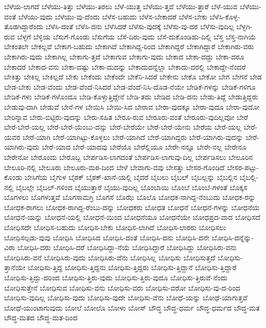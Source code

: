 {ಬೆಳೆಯ-ಲಾಗದೆ
ಬೆಳೆಯು-ತಿತ್ತು
ಬೆಳೆಯು-ತಿರಲು
ಬೆಳೆ-ಯುತ್ತ
ಬೆಳೆಯು-ತ್ತವೆ
ಬೆಳೆಯು-ತ್ತಾರೆ
ಬೆಳೆ-ಯುವ
ಬೆಳೆಯು-ವಂತೆ
ಬೆಳೆಯು-ವುದು
ಬೆಳೆಯು-ವು-ದೆಂದು
ಬೆಳೆಸ-ಬಹುದು
ಬೆಳೆಸ-ಬೇಕಾದರೆ
ಬೆಳೆಸ-ಬೇಕು
ಬೆಳೆಸಿ-ಕೊಳ್ಳ-ತೊಡಗಿದ್ದಾರೆಂದು
ಬೆಳೆಸಿ-ದಂತೆ
ಬೆಳೆಸಿ-ದನು
ಬೆಳೆಸಿದರೆ
ಬೆಳೆಸು-ವುದಕ್ಕೆ
ಬೆಳೆಸು-ವು-ದರ
ಬೆಳೆಸು-ವುದಿಲ್ಲ
ಬೆಳ್ಳಗಿ-ರುವ
ಬೆಳ್ಳಗೆ
ಬೆಳ್ಳಿಯ
ಬೆಸುಗೆ-ಗೊಂಡು
ಬೆಸುಗೆಯ
ಬೆಸೆ-ದಿರು-ವುದು
ಬೆಸೆ-ದುಕೊಂಡಿಹು-ದಿಲ್ಲಿ
ಬೆಸ್ತ
ಬೆಸ್ತ-ನಾಗಿಯೆ
ಬೇಕಂತಲೇ
ಬೇಕಲ್ಲವೆ
ಬೇಕಾಗ-ಬಹುದು
ಬೇಕಾಗಿದೆ
ಬೇಕಾಗಿದ್ದ-ರಿಂದ
ಬೇಕಾಗಿದ್ದರೆ
ಬೇಕಾಗಿದ್ದಾರೆ
ಬೇಕಾಗಿರು-ವರು
ಬೇಕಾಗಿರು-ವುದು
ಬೇಕಾಗಿಲ್ಲ
ಬೇಕಾಗು-ತ್ತದೆ
ಬೇಕಾಗುವ
ಬೇಕಾಗು-ವುದು
ಬೇಕಾದ
ಬೇಕಾ-ದದ್ದು
ಬೇಕಾ-ದರೂ
ಬೇಕಾದರೆ
ಬೇಕಾದ-ವನು
ಬೇಕಾ-ದಷ್ಟು
ಬೇಕಾ-ದುದನ್ನು
ಬೇಕಾದುದನ್ನೆಲ್ಲಾ
ಬೇಕಾದು-ದರಲ್ಲಿ
ಬೇಕಾದ್ದೇ-ನೆಂದರೆ
ಬೇಕಿತ್ತು
ಬೇಕಿಲ್ಲ
ಬೇಕಿಲ್ಲದೆ
ಬೇಕು
ಬೇಕೆಂದು
ಬೇಕೆಂದೇ
ಬೇಕೆನಿ-ಸಿದರೆ
ಬೇಕೇನು
ಬೇಕೊ
ಬೇಕೋ
ಬೇಗ
ಬೇಗನೆ
ಬೇಡ
ಬೇಡ-ಬೇಕು
ಬೇಡ-ವೆಂದು
ಬೇಡ-ವೆಂದೆ-ನಿಸಿದರೆ
ಬೇಡ-ವೆಂದೆ-ನಿಸಿ-ದೊಡ-ನೆಯೇ
ಬೇಡಿಕೆ-ಗಳನ್ನು
ಬೇಡಿಕೆ-ಗಳಿಗೂ
ಬೇಡಿಕೆ-ಗಳು
ಬೇಡಿಕೆ-ಗಳೊಂದೂ
ಬೇಡಿ-ಕೊಳ್ಳುತ್ತಿದ್ದೇನೆ
ಬೇಡಿ-ತದು
ಬೇಡಿದ
ಬೇಡಿ-ದನು
ಬೇಡು-ತಿದ್ದೆ
ಬೇಡುತ್ತಿದ್ದರು
ಬೇಡುವು-ದಾಗಿ
ಬೇಡುವೆ
ಬೇನೆ-ಗಳ
ಬೇಯಿಸಿ
ಬೇಯಿ-ಸಿದ
ಬೇರಾವ
ಬೇರಾ-ವುದಕ್ಕೂ
ಬೇರಾ-ವುದೂ
ಬೇರಾ-ವುದೋ
ಬೇರಿನ್ನಾವ
ಬೇರು-ಬಿಟ್ಟಿರು-ವುದನ್ನು
ಬೇರು-ಸಹಿತ
ಬೇರೂ-ರುವ
ಬೇರೂರು-ವಂತೆ
ಬೇರೂರು-ವುದಿಲ್ಲವೋ
ಬೇರೆ
ಬೇರೆ-ಬೇರೆ-ಯಲ್ಲ
ಬೇರೆ-ಬೇರೆ-ಯೆಂಬು-ದನ್ನು
ಬೇರೆ-ಬೇರೆಯೇ
ಬೇರೆ-ಬೇರೆ-ಯೇನು
ಬೇರೆಯ
ಬೇರೆ-ಯಲ್ಲ
ಬೇರೆ-ಯವರ
ಬೇರೆ-ಯಾಗಿ
ಬೇರೆ-ಯಾಗಿಟ್ಟು-ಕೊಳ್ಳಲು
ಬೇರೆ-ಯಾಗಿದೆ
ಬೇರೆ-ಯಾಗಿದ್ದರು
ಬೇರೆ-ಯಾಗಿರು-ವುದನ್ನು
ಬೇರೆ-ಯಾಗಿರು-ವುದು
ಬೇರೆ-ಯಾದ
ಬೇರೆ-ಯಾದವು
ಬೇರೆಯೊ
ಬೇರೆಲ್ಲಿಯೂ
ಬೇರೇ-ನನ್ನೂ
ಬೇರೇ-ನಲ್ಲ
ಬೇರೇನೂ
ಬೇರೇನೋ
ಬೇರೊಂದು
ಬೇರೊಬ್ಬ
ಬೇರ್ಪಡಿಸ-ಲಾಗದಂತೆ
ಬೇರ್ಪಡಿಸ-ಲಾಗುವು-ದಿಲ್ಲ
ಬೇರ್ಪಡಿಸಲು
ಬೇಲೂರಿನ
ಬೇಲೂರಿ-ನಲ್ಲಿ
ಬೇಲೂರು
ಬೇಲೂರು-ಮಠ-ದಿಂದ
ಬೇಳೆ
ಬೇವಾಗು-ವವು
ಬೇಸತ್ತು
ಬೇಸರ-ಗೊಂಡಿದೆ
ಬೇಸರ-ಪಟ್ಟು-ಕೊಂಡು
ಬೇಸಿಗೆಯ
ಬೈಗುಳ
ಬೈಠಕ್
ಬೈಠಕ್-ಖಾನೆ-ಯಲ್ಲಿ
ಬೈದರೆ
ಬೈಬಲು
ಬೈಬಲ್
ಬೈಬಲ್ಲನ್ನು
ಬೈಬಲ್ಲಿನ
ಬೈಬಲ್ಲಿ-ನಲ್ಲಿ
ಬೈಬಲ್ಲೇ
ಬೈಬಲ್-ಗಳಿಂದ
ಬೈಯುತ್ತಾರೆ
ಬೈಯು-ವುದಿಲ್ಲ
ಬೊಂಬಾಯಿ
ಬೊಂಬೆ
ಬೊಂಬೆ-ಗಳಂತೆ
ಬೊಕ್ಕಸ
ಬೊಗಳಲು
ಬೊಗಳುತ್ತವೆ
ಬೊಗಸಾಮಗ್ರಿ
ಬೊಗಸೆ
ಬೊಝೆ
ಬೊಲೊ
ಬೋಧಕ-ನಾಗಿದ್ದ-ನೆಂಬುದು
ಬೋಧಕ-ರನ್ನು
ಬೋಧಕ-ರಾಗಲು
ಬೋಧಕ-ರಾಗಿದ್ದ-ರೆಂಬು-ದನ್ನು
ಬೋಧಕರು
ಬೋಧತ
ಬೋಧನೆ
ಬೋಧನೆ-ಗಳನ್ನು
ಬೋಧನೆಯ
ಬೋಧನೆ-ಯನ್ನು
ಬೋಧನೆ-ಯಲ್ಲಿ
ಬೋಧನೆ-ಯಿಂದ
ಬೋಧನೆಯೂ
ಬೋಧನೆಯೇ
ಬೋಧಪ್ರದ-ವಾದ
ಬೋಧಿಸದೆ
ಬೋಧಿಸದೇ
ಬೋಧಿಸ-ಬಹುದು
ಬೋಧಿಸ-ಬೇಕು
ಬೋಧಿಸ-ಲಾಗಿದೆ
ಬೋಧಿಸ-ಲಾರರು
ಬೋಧಿಸಲು
ಬೋಧಿಸಲ್ಪಡು-ವುವು
ಬೋಧಿಸಿ
ಬೋಧಿಸಿದ
ಬೋಧಿಸಿ-ದಂತೆ
ಬೋಧಿಸಿ-ದನು
ಬೋಧಿಸಿ-ದನೇ
ಬೋಧಿಸಿ-ದನ್ನೆನ್ನು-ವಿರಾ
ಬೋಧಿಸಿ-ದರು
ಬೋಧಿಸಿ-ದರೆ
ಬೋಧಿಸಿದ್ದಾ-ನೆಯೆ
ಬೋಧಿಸಿದ್ದಾರೆ
ಬೋಧಿಸಿದ್ದು
ಬೋಧಿಸಿರು-ವನು
ಬೋಧಿಸಿರು-ವನೆ
ಬೋಧಿಸಿರು-ವುದು
ಬೋಧಿಸಿರು-ವೆನು
ಬೋಧಿಸಿಲ್ಲ
ಬೋಧಿಸು
ಬೋಧಿಸುತ್ತದೆ
ಬೋಧಿಸು-ತ್ತಾನೆಯೇ
ಬೋಧಿಸು-ತ್ತಿದ್ದ
ಬೋಧಿಸು-ತ್ತಿದ್ದನು
ಬೋಧಿಸು-ತ್ತಿದ್ದರು
ಬೋಧಿಸು-ತ್ತಿದ್ದಾನೆ
ಬೋಧಿಸು-ತ್ತಿದ್ದಾರೆ
ಬೋಧಿಸು-ತ್ತಿದ್ದು-ದರಿಂದ
ಬೋಧಿಸು-ತ್ತಿರು-ವುದು
ಬೋಧಿಸು-ತ್ತಿರು-ವುದೂ
ಬೋಧಿಸು-ತ್ತಿರುವೆ-ನೆಂದು
ಬೋಧಿಸುತ್ತೇನೆ
ಬೋಧಿಸುವ
ಬೋಧಿಸು-ವನು
ಬೋಧಿಸು-ವರು
ಬೋಧಿಸು-ವರೋ
ಬೋಧಿಸು-ವು-ದ-ರಿಂದ
ಬೋಧಿಸು-ವುದಿಲ್ಲ
ಬೋಧಿಸು-ವುದು
ಬೋಧಿಸು-ವುದೇ
ಬೋಧಿಸು-ವೆನು
ಬೋಧೆ-ಯನ್ನು
ಬೋಧೆ-ಯಾಗುತ್ತವೆ
ಬೋಧೆ-ಯುಂಟಾಗುವುದು
ಬೋಲೆ
ಬೋಲೊ
ಬೋಳು
ಬೋಸ್
ಬೌದ್ಧ
ಬೌದ್ಧ-ಧರ್ಮ
ಬೌದ್ಧ-ಧರ್ಮದ
ಬೌದ್ಧ-ಮತ
ಬೌದ್ಧ-ಮತದ
ಬೌದ್ಧ-ಮತ-ದಿಂದ
}

